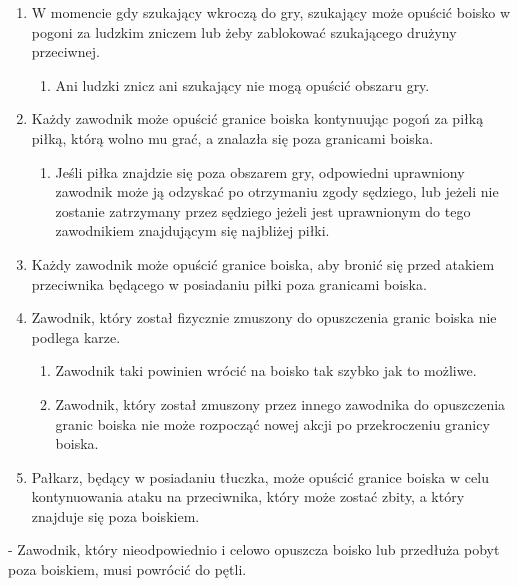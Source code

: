 \documentclass[12pt]{article}
\newcommand\other{\bgroup\color{green}\markoverwith{\textcolor{green}{\rule[-0.5ex]{2pt}{0.4pt}}}\ULon}
\begin{document}
\begin{enumerate}
	\item
	      W momencie gdy szukający wkroczą do gry, szukający może opuścić boisko
	      w pogoni za ludzkim zniczem lub żeby zablokować szukającego drużyny
	      przeciwnej.

	      \begin{enumerate}
		      \item
		            Ani ludzki znicz ani szukający nie mogą opuścić obszaru gry.
	      \end{enumerate}
	\item
	      Każdy zawodnik może opuścić granice boiska kontynuując pogoń za piłką
	      piłką, którą wolno mu grać, a znalazła się poza granicami boiska.

	      \begin{enumerate}
		      \item
		            Jeśli piłka znajdzie się poza obszarem gry, odpowiedni uprawniony
		            zawodnik może ją odzyskać po otrzymaniu zgody sędziego, lub jeżeli
		            nie zostanie zatrzymany przez sędziego jeżeli jest uprawnionym do
		            tego zawodnikiem znajdującym się najbliżej piłki.
	      \end{enumerate}
	\item
	      Każdy zawodnik może opuścić granice boiska, aby bronić się przed
	      atakiem przeciwnika będącego w posiadaniu piłki poza granicami boiska.
	\item
	      Zawodnik, który został fizycznie zmuszony do opuszczenia granic boiska
	      nie podlega karze.

	      \begin{enumerate}
		      \item
		            Zawodnik taki powinien wrócić na boisko tak szybko jak to możliwe.
		      \item
		            Zawodnik, który został zmuszony przez innego zawodnika do
		            opuszczenia granic boiska nie może rozpocząć nowej akcji po
		            przekroczeniu granicy boiska.
	      \end{enumerate}
	\item
	      Pałkarz, będący w posiadaniu tłuczka, może opuścić granice boiska w
	      celu kontynuowania ataku na przeciwnika, który może zostać zbity, a
	      który znajduje się poza boiskiem.
\end{enumerate}

\other{Powrót do pętli} - Zawodnik, który nieodpowiednio i celowo opuszcza
boisko lub przedłuża pobyt poza boiskiem, musi powrócić do pętli.
\end{document}
